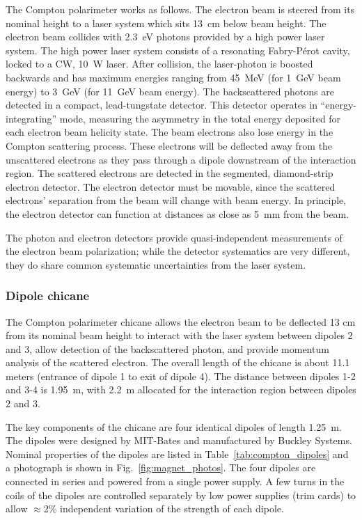 {The Compton polarimeter works as follows. The electron beam is steered from its nominal height to a laser
system which sits 13~cm below beam height. The electron beam collides with 2.3~eV photons provided by a
high power laser system. The high power laser system consists of a resonating Fabry-P\'{e}rot cavity, locked
to a CW, 10~W laser. After collision, the laser-photon is boosted backwards and has maximum energies ranging
from 45~MeV (for 1~GeV beam energy) to 3~GeV (for 11~GeV beam energy).  The backscattered photons
are detected in a compact, lead-tungstate detector. This detector operates in ``energy-integrating'' mode, measuring
the asymmetry in the total energy deposited for each electron beam helicity state. The beam electrons also lose
energy in the Compton scattering process. These electrons will be deflected away from the unscattered electrons
as they pass through a dipole downstream of the interaction region. The scattered electrons are detected
in the segmented, diamond-strip electron detector.  The electron detector must be movable, since the scattered
electrons' separation from the beam will change with beam energy. In principle, the electron detector can
function at distances as close as 5~mm from the beam.

The photon and electron detectors provide quasi-independent measurements of the electron beam polarization;
while the detector systematics are very different, they do share common systematic uncertainties from the laser
system.

\subsubsection{Dipole chicane}
The Compton polarimeter chicane allows the electron beam to be deflected 13 cm from its nominal beam
height to interact with the laser system between dipoles 2 and 3, allow detection of the backscattered
photon, and provide momentum analysis of the scattered electron. The overall length of the chicane is about
11.1 meters (entrance of dipole 1 to exit of dipole 4). The distance between dipoles 1-2 and 3-4 is 1.95~m,
with 2.2~m allocated for the interaction region between dipoles 2 and 3.

The key components of the chicane are four identical dipoles of length 1.25~m. The dipoles were
designed by MIT-Bates and manufactured by Buckley Systems. Nominal properties of the dipoles are listed
in Table~\ref{tab:compton_dipoles} and a photograph is shown in Fig.~\ref{fig:magnet_photos}. The four
dipoles are connected in series and powered from a single power supply. A few turns in the coils of the
dipoles are controlled separately by low power supplies (trim cards) to allow $\approx$2\% independent variation
of the strength of each dipole.

}
